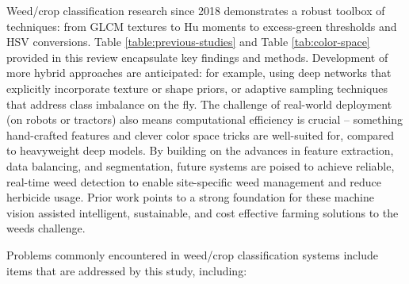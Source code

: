 \documentclass[letterpaper]{report}
\begin{document}
%
Weed/crop classification research since 2018 demonstrates a robust toolbox of techniques: from GLCM textures to Hu moments to excess-green thresholds and HSV conversions. Table \ref{table:previous-studies} and Table \ref{tab:color-space} provided in this review encapsulate key findings and methods. Development of more hybrid approaches are anticipated: for example, using deep networks that explicitly incorporate texture or shape priors, or adaptive sampling techniques that address class imbalance on the fly. The challenge of real-world deployment (on robots or tractors) also means computational efficiency is crucial – something hand-crafted features and clever color space tricks are well-suited for, compared to heavyweight deep models. By building on the advances in feature extraction, data balancing, and segmentation, future systems are poised to achieve reliable, real-time weed detection to enable site-specific weed management and reduce herbicide usage. Prior work points to  a strong foundation for these machine vision assisted intelligent, sustainable, and cost effective farming solutions to the weeds challenge.
%
%

Problems commonly encountered in weed/crop classification systems include items that are addressed by this study, including:
\end{document}
